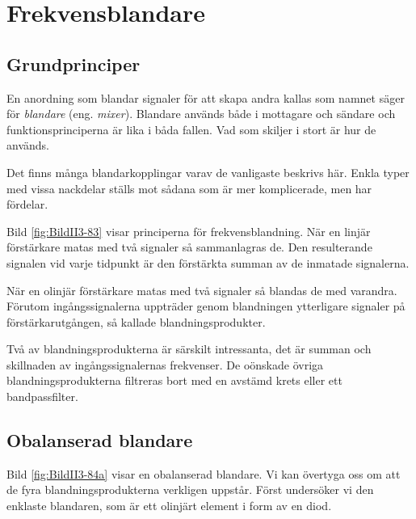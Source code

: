 \section{Frekvensblandare}
\label{blandare}

\subsection{Grundprinciper}

En anordning som blandar signaler för att skapa andra kallas som namnet säger
för \emph{blandare} (eng. \emph{mixer}).
Blandare används både i mottagare och sändare och funktionsprinciperna är lika
i båda fallen.
Vad som skiljer i stort är hur de används.

Det finns många blandarkopplingar varav de vanligaste beskrivs här.
Enkla typer med vissa nackdelar ställs mot sådana som är mer
komplicerade, men har fördelar.


Bild \ref{fig:BildII3-83} visar principerna för frekvensblandning.
När en linjär förstärkare matas med två signaler så sammanlagras de.
Den resulterande signalen vid varje tidpunkt är den förstärkta summan av de
inmatade signalerna.

När en olinjär förstärkare matas med två signaler så blandas de med varandra.
Förutom ingångssignalerna uppträder genom blandningen ytterligare signaler på
förstärkarutgången, så kallade blandningsprodukter.

Två av blandningsprodukterna är särskilt intressanta, det är summan och
skillnaden av ingångssignalernas frekvenser.
De oönskade övriga blandningsprodukterna filtreras bort med en avstämd krets
eller ett bandpassfilter.

\newpage
\subsection{Obalanserad blandare}


Bild \ref{fig:BildII3-84a} visar en obalanserad blandare.
Vi kan övertyga oss om att de fyra blandningsprodukterna verkligen uppstår.
Först undersöker vi den enklaste blandaren, som är ett olinjärt element i form
av en diod.


